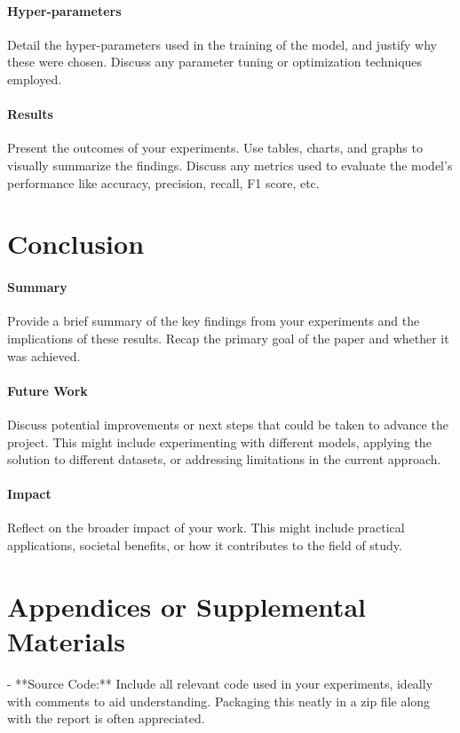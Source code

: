 \documentclass{article}
\begin{document}
\paragraph{Hyper-parameters}
Detail the hyper-parameters used in the training of the model, and justify why these were chosen. Discuss any parameter tuning or optimization techniques employed.

\paragraph{Results}
Present the outcomes of your experiments. Use tables, charts, and graphs to visually summarize the findings. Discuss any metrics used to evaluate the model’s performance like accuracy, precision, recall, F1 score, etc.

\section{Conclusion}

\paragraph{Summary}
Provide a brief summary of the key findings from your experiments and the implications of these results. Recap the primary goal of the paper and whether it was achieved.

\paragraph{Future Work}
Discuss potential improvements or next steps that could be taken to advance the project. This might include experimenting with different models, applying the solution to different datasets, or addressing limitations in the current approach.

\paragraph{Impact}
Reflect on the broader impact of your work. This might include practical applications, societal benefits, or how it contributes to the field of study.

\section{Appendices or Supplemental Materials}

- **Source Code:** Include all relevant code used in your experiments, ideally with comments to aid understanding. Packaging this neatly in a zip file along with the report is often appreciated.
  
\end{document}
